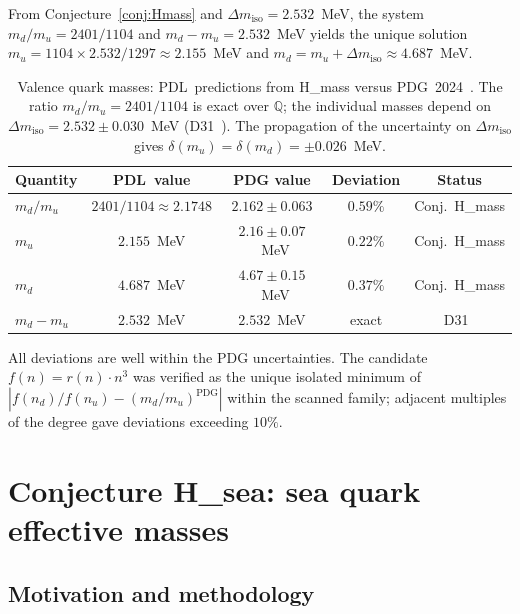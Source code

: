 \documentclass[12pt,a4paper]{article}
\def\PDL{PDL}
\theoremstyle{plain}
\theoremstyle{definition}
\theoremstyle{remark}
\newcommand{\PDL}{\textnormal{PDL}}
\newcommand{\nnu}{n_u}
\newcommand{\nnd}{n_d}
\newcommand{\Dmiso}{\Delta m_{\mathrm{iso}}}
\newcommand{\mup}{m_u}
\newcommand{\mdown}{m_d}
\begin{document}
From Conjecture~\ref{conj:Hmass} and $\Dmiso = 2.532$~MeV, the system $\mdown/\mup = 2401/1104$ and $\mdown - \mup = 2.532$~MeV yields the unique solution $\mup = 1104 \times 2.532 / 1297 \approx 2.155$~MeV and $\mdown = \mup + \Dmiso \approx 4.687$~MeV.

\begin{table}[H]
\centering
\caption{Valence quark masses: \PDL\ predictions from H\_mass versus PDG~2024~\cite{PDG2024}. The ratio $\mdown/\mup = 2401/1104$ is exact over $\mathbb{Q}$; the individual masses depend on $\Dmiso = 2.532 \pm 0.030$~MeV (D31~\cite{D31}). The propagation of the uncertainty on $\Dmiso$ gives $\delta(\mup) = \delta(\mdown) = \pm 0.026$~MeV.}
\label{tab:Hmass}
\renewcommand{\arraystretch}{1.3}
\begin{tabular}{lcccc}
\toprule
Quantity & \PDL\ value & PDG value & Deviation & Status \\
\midrule
$\mdown/\mup$ & $2401/1104 \approx 2.1748$ & $2.162 \pm 0.063$ & $0.59\%$ & Conj.\ H\_mass \\
$\mup$ & $2.155$~MeV & $2.16 \pm 0.07$~MeV & $0.22\%$ & Conj.\ H\_mass \\
$\mdown$ & $4.687$~MeV & $4.67 \pm 0.15$~MeV & $0.37\%$ & Conj.\ H\_mass \\
$\mdown - \mup$ & $2.532$~MeV & $2.532$~MeV & exact & D31~\cite{D31} \\
\bottomrule
\end{tabular}
\end{table}

All deviations are well within the PDG uncertainties. The candidate $f(n) = r(n) \cdot n^3$ was verified as the unique isolated minimum of $|f(\nnd)/f(\nnu) - (\mdown/\mup)^{\mathrm{PDG}}|$ within the scanned family; adjacent multiples of the degree gave deviations exceeding $10\%$.

\section{\texorpdfstring{Conjecture H\_sea: sea quark effective masses}{Conjecture H-sea: sea quark effective masses}}
\label{sec:Hsea}

\subsection{Motivation and methodology}
\label{subsec:motivation_sea}
\end{document}
